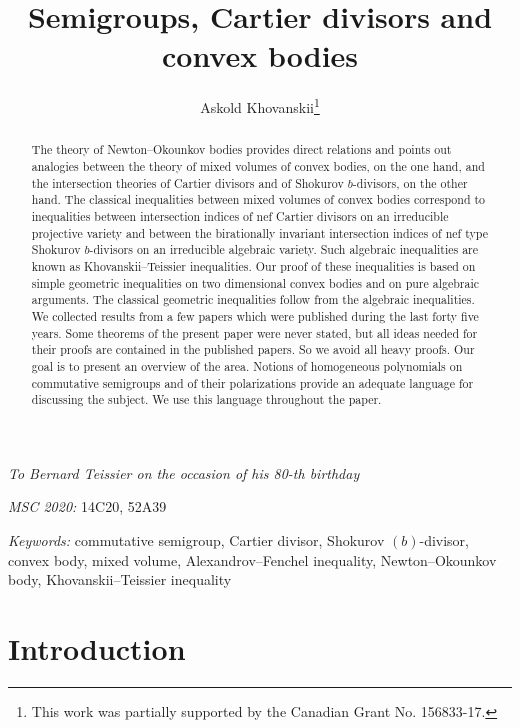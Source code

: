 \documentclass[11pt]{article}
\theoremstyle{plain}
\theoremstyle{definition}
\begin{document}

\title{Semigroups, Cartier divisors and convex bodies}

\author{Askold Khovanskii\thanks{This work was partially supported by the Canadian Grant No. 156833-17.}}
\maketitle
{\it To Bernard Teissier on the occasion of his 80-th birthday}
\begin{abstract}
The theory of Newton--Okounkov bodies provides direct relations  and points out analogies between the theory of mixed volumes of convex bodies, on the one hand, and the intersection theories of Cartier divisors and  of Shokurov $b$-divisors, on the other hand. The classical inequalities between mixed volumes of convex bodies correspond to inequalities between intersection indices of nef Cartier divisors on an irreducible projective variety and between the birationally invariant intersection indices of  nef  type Shokurov $b$-divisors on an irreducible algebraic variety. Such algebraic inequalities are known as Khovanskii--Teissier inequalities.  Our proof of these inequalities is based on simple geometric inequalities on two dimensional convex bodies and on pure algebraic arguments. The classical  geometric inequalities follow from the algebraic inequalities. We collected results  from a few papers which  were  published during the last forty  five years. Some theorems  of the present paper were never stated, but all ideas needed for their proofs are contained in the published papers. So we avoid all heavy  proofs. Our goal is to present an overview of the area. Notions of  homogeneous polynomials on commutative semigroups and of their polarizations  provide an  adequate  language  for discussing  the subject. We use this language throughout  the paper.
\end{abstract}



{\it MSC 2020:} 14C20, {52A39}

{\it Keywords:} {commutative  semigroup, Cartier divisor, Shokurov
$(b)$-divisor,  convex body, mixed volume,
Alexandrov--Fenchel inequality, Newton--Okounkov body,
Khovanskii--Teissier inequality}

\section{Introduction}\label{sect1}
\end{document}
